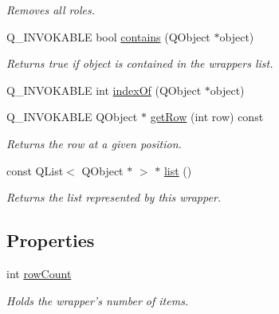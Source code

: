 \begin{DoxyCompactItemize}
\begin{DoxyCompactList}\small\item\em Removes all roles. \end{DoxyCompactList}\item 
\hypertarget{classQListQmlWrapper_a6d3cd7291fa7b1d79b6bd488dc549e4f}{Q\-\_\-\-I\-N\-V\-O\-K\-A\-B\-L\-E bool \hyperlink{classQListQmlWrapper_a6d3cd7291fa7b1d79b6bd488dc549e4f}{contains} (Q\-Object $\ast$object)}\label{classQListQmlWrapper_a6d3cd7291fa7b1d79b6bd488dc549e4f}

\begin{DoxyCompactList}\small\item\em Returns {\ttfamily true} if {\ttfamily object} is contained in the wrappers list. \end{DoxyCompactList}\item 
Q\-\_\-\-I\-N\-V\-O\-K\-A\-B\-L\-E int \hyperlink{classQListQmlWrapper_a9430d2a06f3ee285538717f874d9f876}{index\-Of} (Q\-Object $\ast$object)
\item 
\hypertarget{classQListQmlWrapper_a473a63842191ef808dc8e5c1047f9f8f}{Q\-\_\-\-I\-N\-V\-O\-K\-A\-B\-L\-E Q\-Object $\ast$ \hyperlink{classQListQmlWrapper_a473a63842191ef808dc8e5c1047f9f8f}{get\-Row} (int row) const }\label{classQListQmlWrapper_a473a63842191ef808dc8e5c1047f9f8f}

\begin{DoxyCompactList}\small\item\em Returns the row at a given position. \end{DoxyCompactList}\item 
\hypertarget{classQListQmlWrapper_a4f476937745f5cb9cdfc5a8849e820a8}{const Q\-List$<$ Q\-Object $\ast$ $>$ $\ast$ \hyperlink{classQListQmlWrapper_a4f476937745f5cb9cdfc5a8849e820a8}{list} ()}\label{classQListQmlWrapper_a4f476937745f5cb9cdfc5a8849e820a8}

\begin{DoxyCompactList}\small\item\em Returns the list represented by this wrapper. \end{DoxyCompactList}\end{DoxyCompactItemize}
\subsection*{Properties}
\begin{DoxyCompactItemize}
\item 
\hypertarget{classQListQmlWrapper_a3aaa4cbf86d838af871a98d96fcbfe52}{int \hyperlink{classQListQmlWrapper_a3aaa4cbf86d838af871a98d96fcbfe52}{row\-Count}}\label{classQListQmlWrapper_a3aaa4cbf86d838af871a98d96fcbfe52}

\begin{DoxyCompactList}\small\item\em Holds the wrapper's number of items. \end{DoxyCompactList}\end{DoxyCompactItemize}


